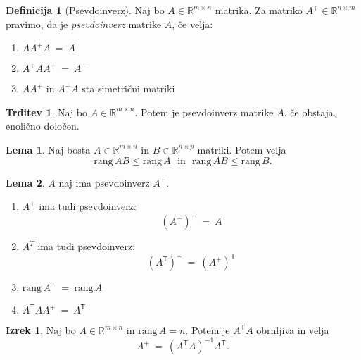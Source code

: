 \documentclass[11pt]{article}
\newcommand{\R}{\mathbb{R}}
\newcommand{\0}{\mathbf{0}}
\newcommand{\rang}{\text{rang}\,}
\newcommand{\T}{\mathsf{T}}
\theoremstyle{definition}
\newtheorem{definicija}{Definicija}[section]
\theoremstyle{definition}
\newtheorem{trditev}{Trditev}[section]
\theoremstyle{definition}
\newtheorem{izrek}{Izrek}[section]
\theoremstyle{definition}
\newtheorem{lema}{Lema}
\begin{document}
\begin{definicija}[Psevdoinverz]

Naj bo $A \in \R^{m \times n}$ matrika. Za matriko $A^+ \in \R^{n \times m}$ pravimo, da je \textit{psevdoinverz} matrike $A$, če velja:
\begin{enumerate}
	\item $AA^+A ~=~ A$
	\item $A^+AA^+ ~=~ A^+$
	\item $AA^+$ in $A^+A$ sta simetrični matriki
\end{enumerate}

\end{definicija}
\vspace{0.5cm}

\begin{trditev}

Naj bo $A \in \R^{m \times n}$. Potem je psevdoinverz matrike $A$, če obstaja, enolično določen.

\end{trditev}
\vspace{0.5cm}

\begin{lema}

Naj bosta $A \in \R^{m \times n}$ in $B \in \R^{n \times p}$ matriki. Potem velja
$$\rang AB \leq \rang A ~~~\text{in}~~~ \rang AB \leq \rang B.$$

\end{lema}
\vspace{0.5cm}

\begin{lema}

$A$ naj ima psevdoinverz $A^+$.
\begin{enumerate}
	\item $A^+$ ima tudi psevdoinverz:
	$$(A^+)^+ ~=~ A$$
	\item $A^T$ ima tudi psevdoinverz:
	$$(A^\T)^+ ~=~ (A^+)^\T$$
	\item $\rang A^+ ~=~ \rang A$
	\item $A^\T AA^+ ~=~ A^\T$
\end{enumerate}

\end{lema}
\vspace{0.5cm}

\begin{izrek}

Naj bo $A \in \R^{m \times n}$ in $\rang A = n$. Potem je $A^\T A$ obrnljiva in velja
$$A^+ ~=~ (A^\T A)^{-1} A^\T.$$

\end{izrek}
\vspace{0.5cm}
\end{document}
